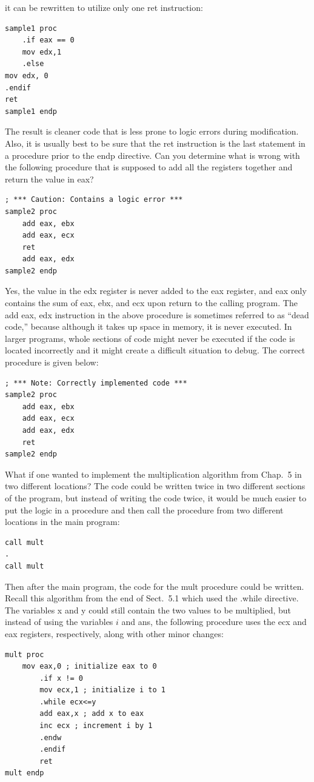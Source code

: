 \documentclass[10pt]{book}
\begin{document}
it can be rewritten to utilize only one ret instruction:

\begin{verbatim}
sample1 proc
    .if eax == 0
    mov edx,1
    .else
mov edx, 0
.endif
ret
sample1 endp
\end{verbatim}

The result is cleaner code that is less prone to logic errors during modification. Also, it is usually best to be sure that the ret instruction is the last statement in a procedure prior to the endp directive. Can you determine what is wrong with the following procedure that is supposed to add all the registers together and return the value in eax?

\begin{verbatim}
; *** Caution: Contains a logic error ***
sample2 proc
    add eax, ebx
    add eax, ecx
    ret
    add eax, edx
sample2 endp
\end{verbatim}

Yes, the value in the edx register is never added to the eax register, and eax only contains the sum of eax, ebx, and ecx upon return to the calling program. The add eax, edx instruction in the above procedure is sometimes referred to as “dead code,” because although it takes up space in memory, it is never executed. In larger programs, whole sections of code might never be executed if the code is located incorrectly and it might create a difficult situation to debug. The correct procedure is given below:

\begin{verbatim}
; *** Note: Correctly implemented code ***
sample2 proc
    add eax, ebx
    add eax, ecx
    add eax, edx
    ret
sample2 endp
\end{verbatim}

What if one wanted to implement the multiplication algorithm from Chap.\ 5 in two different locations? The code could be written twice in two different sections of the program, but instead of writing the code twice, it would be much easier to put the logic in a procedure and then call the procedure from two different locations in the main program:

\begin{verbatim}
call mult
.
call mult
\end{verbatim}

Then after the main program, the code for the mult procedure could be written. Recall this algorithm from the end of Sect.\ 5.1 which used the .while directive. The variables x and y could still contain the two values to be multiplied, but instead of using the variables $i$ and ans, the following procedure uses the ecx and eax registers, respectively, along with other minor changes:
\begin{verbatim}
mult proc
    mov eax,0 ; initialize eax to 0
        .if x != 0
        mov ecx,1 ; initialize i to 1
        .while ecx<=y
        add eax,x ; add x to eax
        inc ecx ; increment i by 1
        .endw
        .endif
        ret
mult endp
\end{verbatim}
\end{document}
